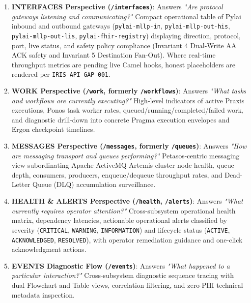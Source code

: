 \begin{enumerate}
\begin{itemize}
        \item \textbf{Middleware Subordination}: Subordinates runtime infrastructure under consuming Harmonia capabilities (ActiveMQ Artemis under Petasos, Infinispan under Mneme, PostgreSQL under Mnemosyne, Synapse under Agora).

\par\noindent\textbf{------- Legacy Content - Superseded ------- Finish ----}

    \end{itemize}

    \item \textbf{INTERFACES Perspective (\texttt{/interfaces})}:
    Answers \textit{"Are protocol gateways listening and communicating?"}
    Compact operational table of Pylai inbound and outbound gateways (\texttt{pylai-mllp-in}, \texttt{pylai-mllp-out-his}, \texttt{pylai-mllp-out-lis}, \texttt{pylai-fhir-registry}) displaying direction, protocol, port, live status, and safety policy compliance (Invariant 4 Dual-Write AA ACK safety and Invariant 5 Destination Fan-Out). Where real-time throughput metrics are pending live Camel hooks, honest placeholders are rendered per \texttt{IRIS-API-GAP-001}.

    \item \textbf{WORK Perspective (\texttt{/work}, formerly \texttt{/workflows})}:
    Answers \textit{"What tasks and workflows are currently executing?"}
    High-level indicators of active Praxis executions, Ponos task worker rates, queued/running/completed/failed work, and diagnostic drill-down into concrete Pragma execution envelopes and Ergon checkpoint timelines.

    \item \textbf{MESSAGES Perspective (\texttt{/messages}, formerly \texttt{/queues})}:
    Answers \textit{"How are messaging transport and queues performing?"}
    Petasos-centric messaging view subordinating Apache ActiveMQ Artemis cluster node health, queue depth, consumers, producers, enqueue/dequeue throughput rates, and Dead-Letter Queue (DLQ) accumulation surveillance.

    \item \textbf{HEALTH \& ALERTS Perspective (\texttt{/health}, \texttt{/alerts})}:
    Answers \textit{"What currently requires operator attention?"}
    Cross-subsystem operational health matrix, dependency latencies, actionable operational alerts classified by severity (\texttt{CRITICAL}, \texttt{WARNING}, \texttt{INFORMATION}) and lifecycle status (\texttt{ACTIVE}, \texttt{ACKNOWLEDGED}, \texttt{RESOLVED}), with operator remediation guidance and one-click acknowledgment actions.

    \item \textbf{EVENTS Diagnostic Flow (\texttt{/events})}:
    Answers \textit{"What happened to a particular interaction?"}
    Cross-subsystem diagnostic sequence tracing with dual Flowchart and Table views, correlation filtering, and zero-PHI technical metadata inspection.
\end{enumerate}


